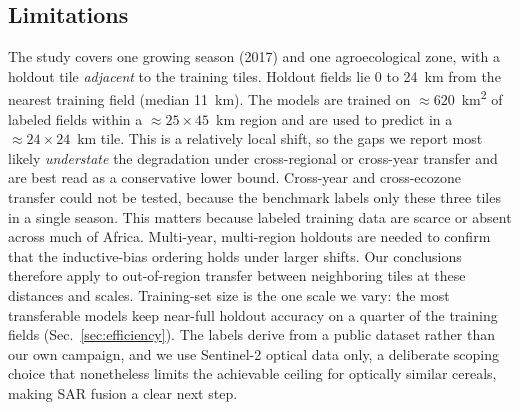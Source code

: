 \documentclass[preprint,authoryear]{elsarticle}
\begin{document}
\subsection{Limitations}
The study covers one growing season (2017) and one agroecological zone, with a holdout tile \emph{adjacent} to the training tiles. Holdout fields lie 0 to 24~km from the nearest training field (median 11~km). The models are trained on ${\approx}620$~km\textsuperscript{2} of labeled fields within a ${\approx}25\times45$~km region and are used to predict in a ${\approx}24\times24$~km tile. This is a relatively local shift, so the gaps we report most likely \emph{understate} the degradation under cross-regional or cross-year transfer and are best read as a conservative lower bound. Cross-year and cross-ecozone transfer could not be tested, because the benchmark labels only these three tiles in a single season. This matters because labeled training data are scarce or absent across much of Africa. Multi-year, multi-region holdouts are needed to confirm that the inductive-bias ordering holds under larger shifts. Our conclusions therefore apply to out-of-region transfer between neighboring tiles at these distances and scales.
 Training-set size is the one scale we vary: the most transferable models keep near-full holdout accuracy on a quarter of the training fields (Sec.~\ref{sec:efficiency}). The labels derive from a public dataset rather than our own campaign, and we use Sentinel-2 optical data only, a deliberate scoping choice that nonetheless limits the achievable ceiling for optically similar cereals, making SAR fusion a clear next step.
\end{document}

